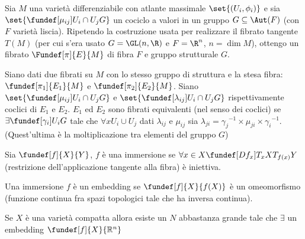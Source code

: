 
\newcommand*\dual{{^\ast}} %
\newcommand*\base[1][B]{\mathcal{#1}} %


Sia $M$ una varietà differenziabile con atlante massimale $\set{(U_i, \phi_i)}$ e sia $\set{ \fundef[\mu_{ij}]{U_i \cap U_j}{G} }$ un cociclo a valori in un gruppo $G \subseteq \Aut(F)$ (con $F$ varietà liscia). Ripetendo la costruzione usata per realizzare il fibrato tangente $T(M)$ (per cui s'era usato $G = \GL(n, \R)$ e $F=\R^n$, $n = \dim M$), ottengo un fibrato $\Fundef[\pi]{E}{M}$ di fibra $F$ e gruppo strutturale $G$.

\begin{defn}
Siano dati due fibrati su $M$ con lo stesso gruppo di struttura e la stesa fibra: $\fundef[\pi_1]{E_1}{M}$ e  $\fundef[\pi_2]{E_2}{M}$.
Siano $\set{ \fundef[\mu_{ij}]{U_i \cap U_j}{G} }$ e $\set{ \fundef[\lambda_{ij}]{U_i \cap U_j}{G} }$ rispettivamente coclici di $E_1$ e $E_2$.
$E_1$ ed $E_2$ sono fibrati equivalenti (nel senso dei coclici) se $\exists \fundef[\gamma_{i}]{U_i}{G}$ tale che $\forall x U_i \cup U_j$ dati $\lambda_{ij}$ e $\mu_{ij}$
sia $\lambda_{ji} = {\gamma_j}^{-1} \times \mu_{ji} \times  {\gamma_i}^{-1}$.  (Quest'ultima è la moltiplicazione tra elementi del gruppo $G$)
\end{defn}

\begin{defn}
Sia $\fundef[f]{X}{Y}$, $f$ è una immersione se $\forall x \in X \fundef[Df_{x}]{T_{x}X}{T_{f(x)} Y}$ (restrizione dell'applicazione tangente alla fibra) è iniettiva.
\end{defn}

\begin{defn}[Embedding] 
 Una immersione $f$ è un embedding se $\fundef[f]{X}{f(X)}$  è un omeomorfismo (funzione continua fra spazi topologici tale che ha inversa continua).
\end{defn}



\begin{teo}
 Se $X$ è una varietà compatta allora esiste un $N$ abbastanza grande tale che $\exists$ un embedding $\fundef[f]{X}{\mathbb{R}^{n}}$
\end{teo}


